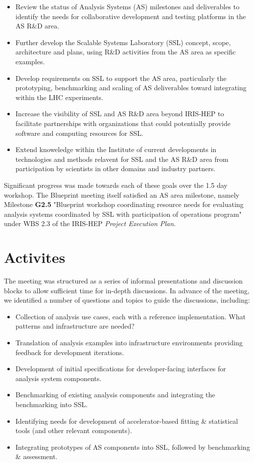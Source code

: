 \documentclass[11pt,letterpaper,fleqn]{article}
\begin{document}
\begin{itemize}
  \item Review the status of Analysis Systems (AS) milestones and deliverables to identify the needs for collaborative development and testing platforms in the AS R\&D area.
  \item Further develop the Scalable Systems Laboratory (SSL) concept, scope, architecture and plans, using R\&D activities from the AS area as specific examples.
  \item Develop requirements on SSL to support the AS area, particularly the prototyping, benchmarking and scaling of AS deliverables toward integrating within the LHC experiments.
  \item Increase the visibility of SSL and AS R\&D area beyond IRIS-HEP to facilitate partnerships with organizations that could potentially provide software and computing resources for SSL.
  \item Extend knoweledge within the Institute of current developments in technologies and methods relavent for SSL and the AS R\&D area from participation by scientists in other domains and industry partners.
\end{itemize}

Significant progress was made towards each of these goals over the 1.5 day workshop. The Blueprint meeting itself satisfied an AS area milestone, namely Milestone {\bf G2.5} "Blueprint workshop coordinating resource needs for evaluating analysis systems coordinated by SSL with participation of operations program" under WBS 2.3 of the IRIS-HEP \textit{Project Execution Plan}.

\section{Activites}
\vspace{0.2cm}
The meeting was structured as a series of informal presentations and discussion blocks to allow sufficient time for in-depth discussions.  In advance of the meeting, we identified a number of questions and topics to guide the discussions, including:

\begin{itemize}
  \item Collection of analysis use cases, each with a reference implementation.  What patterns and infrastructure are needed?
  \item Translation of analysis examples into infrastructure environments providing feedback for development iterations.
  \item Development of initial specifications for developer-facing interfaces for analysis system components.
  \item Benchmarking of existing analysis components and integrating the benchmarking into SSL.
  \item Identifying needs for development of accelerator-based fitting \& statistical tools (and other relevant components).
  \item Integrating prototypes of AS components into SSL, followed by benchmarking \& assessment.
\end{itemize}
\end{document}
